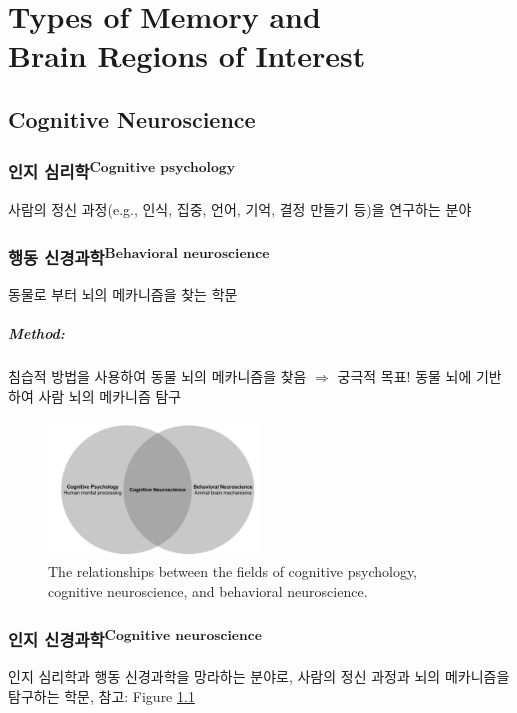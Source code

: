 \documentclass[../note.tex]{subfiles}
\begin{document}
\chapter{Types of Memory and\\Brain Regions of Interest}

\section{Cognitive Neuroscience}

\subsection{인지 심리학\textsuperscript{Cognitive psychology}}
사람의 정신 과정(e.g., 인식, 집중, 언어, 기억, 결정 만들기 등)을 연구하는 분야

\subsection{행동 신경과학\textsuperscript{Behavioral neuroscience}}
동물로 부터 뇌의 메카니즘을 찾는 학문\\

\paragraph{Method: }
침습적 방법을 사용하여 동물 뇌의 메카니즘을 찾음 $\Rightarrow$ 궁극적 목표! 동물 뇌에 기반하여 사람 뇌의 메카니즘 탐구

\begin{figure}[h]
  \centering
  \includegraphics[width=0.5\textwidth]{image/cognitive_relationship}
  \caption{The relationships between the fields of cognitive psychology, cognitive
neuroscience, and behavioral neuroscience.}
  \label{fig:cognitive_relationship}
\end{figure}

\subsection{인지 신경과학\textsuperscript{Cognitive neuroscience}}
인지 심리학과 행동 신경과학을 망라하는 분야로, 사람의 정신 과정과 뇌의 메카니즘을 탐구하는 학문, 참고: Figure \ref{fig:cognitive_relationship}
\end{document}
